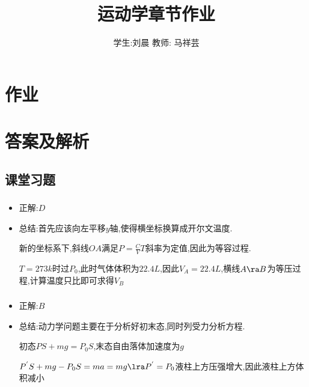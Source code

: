 \documentclass{article}
\title{运动学章节作业}
\author{学生:刘晨 \quad 教师: 马祥芸}
\begin{document}
\maketitle
\tableofcontents
\newpage

\section{作业}

\newpage

\section{答案及解析}
\subsection{课堂习题}
\subsubsection{}
\begin{itemize}
    \item 正解:\quad $D$
    \item 总结:\quad 首先应该向左平移$y$轴,使得横坐标换算成开尔文温度.

          \hspace{3.3em}新的坐标系下,斜线$OA$满足$P = \frac{C}{V}T$斜率为定值,因此为等容过程.

          \hspace{3.3em}$T = 273k$时过$P_{0}$,此时气体体积为$22.4L$,因此$V_{A} = 22.4L$,横线$A \ra B$为等压过程,计算温度只比即可求得$V_{B}$
\end{itemize}

\vspace{2em}

\subsubsection{}
\begin{itemize}
    \item 正解:\quad $B$
    \item 总结:\quad 动力学问题主要在于分析好初末态,同时列受力分析方程.

          \hspace{3.3em}初态$PS + mg = P_{0}S$,末态自由落体加速度为$g$

          \hspace{3.3em}$P^{'}S + mg - P_{0}S = ma = mg \lra P^{'} = P_{0}$液柱上方压强增大,因此液柱上方体积减小
\end{itemize}
\end{document}

